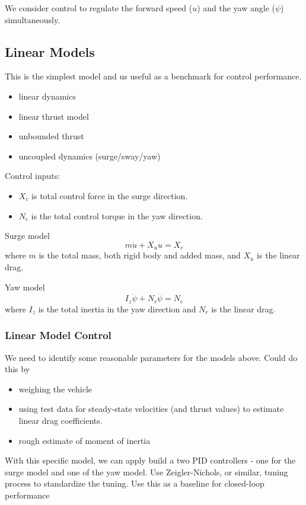 \documentclass[11pt,draftcls,journal,onecolumn]{../latexlib/latex_ieee/IEEEtran}
\begin{document}
We consider control to regulate the forward speed ($u$) and the yaw angle ($\psi$) simultaneously.

\subsection{Linear Models}
This is the simplest model and us useful as a benchmark for control performance.
\begin{itemize}
\item linear dynamics
\item linear thrust model
\item unbounded thrust
\item uncoupled dynamics (surge/sway/yaw)
\end{itemize}

Control inputs:
\begin{itemize}
\item $X_c$ is total control force in the surge direction.
\item $N_c$ is the total control torque in the yaw direction.
\end{itemize}

Surge model
\[
m \dot{u} + X_u u = X_c
\]
where $m$ is the total mass, both rigid body and added mass, and $X_u$ is the linear drag.

Yaw model
\[
I_z \ddot{\psi} + N_r \dot{\psi} = N_c
\]
where $I_z$ is the total inertia in the yaw direction and $N_r$ is the linear drag.

\subsubsection{Linear Model Control}

We need to identify some reasonable parameters for the models above.  Could do this by
\begin{itemize}
\item weighing the vehicle
\item using test data for steady-state velocities (and thrust values) to estimate linear drag coefficients.
\item rough estimate of moment of inertia
\end{itemize}

With this specific model, we can apply build a two PID controllers - one for the surge model and one of the yaw model.  Use Zeigler-Nichols, or similar, tuning process to standardize the tuning.  Use this as a baseline for closed-loop performance
\end{document}
